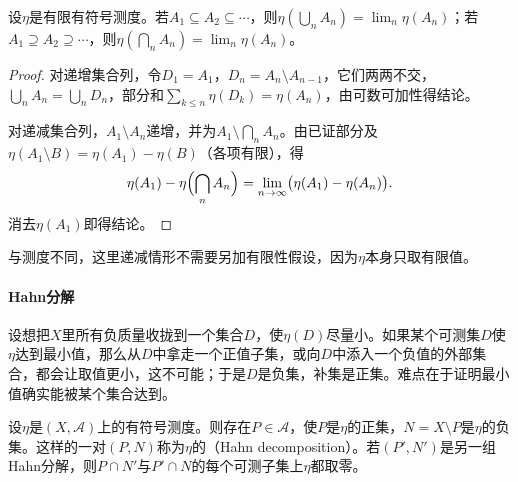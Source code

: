 \begin{lemma}[有符号测度的单调连续性]
\label{lem:meas-signed-continuity}
设$\eta$是有限有符号测度。若$A_1\subseteq A_2\subseteq\cdots$，则$\eta(\bigcup_nA_n)=\lim_n\eta(A_n)$；若$A_1\supseteq A_2\supseteq\cdots$，则$\eta(\bigcap_nA_n)=\lim_n\eta(A_n)$。
\end{lemma}

\begin{proof}
对递增集合列，令$D_1=A_1$，$D_n=A_n\setminus A_{n-1}$，它们两两不交，$\bigcup_nA_n=\bigcup_nD_n$，部分和$\sum_{k\leq n}\eta(D_k)=\eta(A_n)$，由可数可加性得结论。

对递减集合列，$A_1\setminus A_n$递增，并为$A_1\setminus\bigcap_nA_n$。由已证部分及$\eta(A_1\setminus B)=\eta(A_1)-\eta(B)$（各项有限），得
\[
 \eta(A_1)-\eta\Bigl(\bigcap_nA_n\Bigr)=\lim_{n\to\infty}\bigl(\eta(A_1)-\eta(A_n)\bigr).
\]
消去$\eta(A_1)$即得结论。
\end{proof}

与测度不同，这里递减情形不需要另加有限性假设，因为$\eta$本身只取有限值。

\paragraph{Hahn分解}
设想把$X$里所有负质量收拢到一个集合$D$，使$\eta(D)$尽量小。如果某个可测集$D$使$\eta$达到最小值，那么从$D$中拿走一个正值子集，或向$D$中添入一个负值的外部集合，都会让取值更小，这不可能；于是$D$是负集，补集是正集。难点在于证明最小值确实能被某个集合达到。

\begin{theorem}[Hahn分解]
\label{thm:meas-hahn}
设$\eta$是$(X,\mathcal A)$上的有符号测度。则存在$P\in\mathcal A$，使$P$是$\eta$的正集，$N=X\setminus P$是$\eta$的负集。这样的一对$(P,N)$称为$\eta$的（Hahn decomposition）。若$(P',N')$是另一组Hahn分解，则$P\cap N'$与$P'\cap N$的每个可测子集上$\eta$都取零。
\end{theorem}

